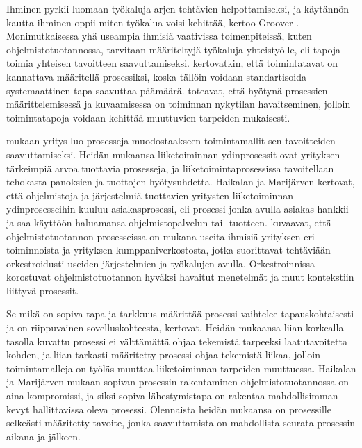 \documentclass[finnish,12pt,a4paper,pdftex]{article}
\begin{document}
Ihminen pyrkii luomaan työkaluja arjen tehtävien helpottamiseksi, ja käytännön kautta ihminen oppii miten työkalua voisi kehittää, kertoo Groover \citeyearpar{groover}. Monimutkaisessa yhä useampia ihmisiä vaativissa toimenpiteissä, kuten ohjelmistotuotannossa, tarvitaan määriteltyjä työkaluja yhteistyölle, eli tapoja toimia yhteisen tavoitteen saavuttamiseksi. \citeauthor{leanit} \citeyearpar{leanit} kertovatkin, että toimintatavat on kannattava määritellä prosessiksi, koska tällöin voidaan standartisoida systemaattinen tapa saavuttaa päämäärä. \citeauthor{leanit} toteavat, että hyötynä prosessien määrittelemisessä ja kuvaamisessa on toiminnan nykytilan havaitseminen, jolloin toimintatapoja voidaan kehittää muuttuvien tarpeiden mukaisesti.

\cite{teollisuustalous} mukaan yritys luo prosesseja muodostaakseen toimintamallit sen tavoitteiden saavuttamiseksi. Heidän mukaansa liiketoiminnan ydinprosessit ovat yrityksen tärkeimpiä arvoa tuottavia prosesseja, ja liiketoimintaprosessissa tavoitellaan tehokasta panoksien ja tuottojen hyötysuhdetta. Haikalan ja Marijärven \citeyearpar{ohjelmistotuotanto} kertovat, että ohjelmistoja ja järjestelmiä tuottavien yritysten liiketoiminnan ydinprosesseihin kuuluu asiakasprosessi, eli prosessi jonka avulla asiakas hankkii ja saa käyttöön haluamansa ohjelmistopalvelun tai -tuotteen. \cite{okaytannot} kuvaavat, että ohjelmistotuotannon prosesseissa on mukana useita ihmisiä yrityksen eri toiminnoista ja yrityksen kumppaniverkostosta, jotka suorittavat tehtäviään orkestroidusti useiden järjestelmien ja työkalujen avulla. Orkestroinnissa korostuvat ohjelmistotuotannon hyväksi havaitut menetelmät ja muut kontekstiin liittyvä prosessit.
 
Se mikä on sopiva tapa ja tarkkuus määrittää prosessi vaihtelee tapauskohtaisesti ja on riippuvainen sovelluskohteesta, \cite{ohjelmistotuotanto} kertovat. Heidän mukaansa liian korkealla tasolla kuvattu prosessi ei välttämättä ohjaa tekemistä tarpeeksi laatutavoitetta kohden, ja liian tarkasti määritetty prosessi ohjaa tekemistä liikaa, jolloin toimintamalleja on työläs muuttaa liiketoiminnan tarpeiden muuttuessa. Haikalan ja Marijärven mukaan sopivan prosessin rakentaminen ohjelmistotuotannossa on aina kompromissi, ja siksi sopiva lähestymistapa on rakentaa mahdollisimman kevyt hallittavissa oleva prosessi. Olennaista heidän mukaansa on prosessille selkeästi määritetty tavoite, jonka saavuttamista on mahdollista seurata prosessin aikana ja jälkeen. 
\end{document}
